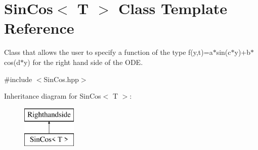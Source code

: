 \hypertarget{class_sin_cos}{}\section{Sin\+Cos$<$ T $>$ Class Template Reference}
\label{class_sin_cos}


Class that allows the user to specify a function of the type f(y,t)=a$\ast$sin(c$\ast$y)+b$\ast$cos(d$\ast$y) for the right hand side of the O\+D\+E.  




{\ttfamily \#include $<$Sin\+Cos.\+hpp$>$}

Inheritance diagram for Sin\+Cos$<$ T $>$\+:\begin{figure}[H]
\begin{center}
\leavevmode
\includegraphics[height=2.000000cm]{class_sin_cos}
\end{center}
\end{figure}
